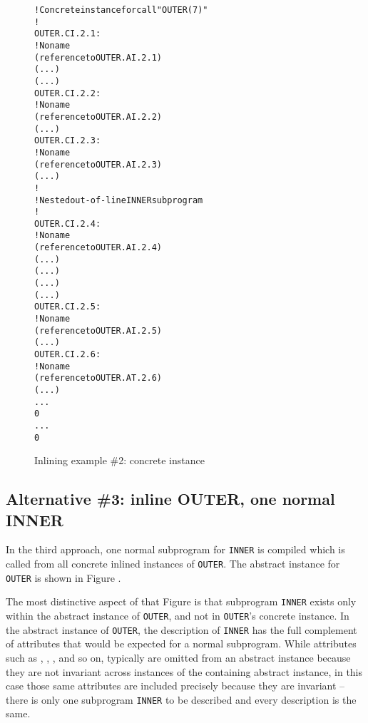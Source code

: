 \begin{figure}[t]
\begin{dwflisting}
\begin{alltt}

    ! Concrete instance for call "OUTER(7)"
    !
OUTER.CI.2.1:
    \DWTAGinlinedsubroutine
        ! No name
        \DWATabstractorigin(reference to OUTER.AI.2.1)
        \DWATlowpc(...)
        \DWAThighpc(...)
OUTER.CI.2.2:
        \DWTAGformalparameter
            ! No name
            \DWATabstractorigin(reference to OUTER.AI.2.2)
            \DWATlocation(...)
OUTER.CI.2.3:
        \DWTAGvariable
            ! No name
            \DWATabstractorigin(reference to OUTER.AI.2.3)
            \DWATlocation(...)
        !
        ! Nested out-of-line INNER subprogram
        !
OUTER.CI.2.4:
        \DWTAGsubprogram
            ! No name
            \DWATabstractorigin(reference to OUTER.AI.2.4)
            \DWATlowpc(...)
            \DWAThighpc(...)
            \DWATframebase(...)
            \DWATstaticlink(...)
OUTER.CI.2.5:
            \DWTAGformalparameter
                ! No name
                \DWATabstractorigin(reference to OUTER.AI.2.5)
                \DWATlocation(...)
OUTER.CI.2.6:
            \DWTAGvariable
                ! No name
                \DWATabstractorigin(reference to OUTER.AT.2.6)
                \DWATlocation(...)
            ...
            0
        ...
        0
\end{alltt}
\end{dwflisting}
\caption{Inlining example \#2: concrete instance}
\label{fig:inliningexample2concreteinstance}
\end{figure}

\subsection{Alternative \#3: inline OUTER, one normal INNER}
\label{app:inlineouteronenormalinner}

In the third approach, one normal subprogram for \texttt{INNER} is
compiled which is called from all concrete inlined instances of
\texttt{OUTER}. The abstract instance for \texttt{OUTER} is shown in 
Figure .

The most distinctive aspect of that Figure is that subprogram
\texttt{INNER} exists only within the abstract instance of \texttt{OUTER},
and not in \texttt{OUTER}\textquoteright s concrete instance. In the abstract
instance of \texttt{OUTER}, the description of \texttt{INNER} has the full
complement of attributes that would be expected for a
normal subprogram. 
While attributes such as 
\DWATlowpc,
\DWAThighpc, 
\DWATlocation,
and so on, typically are omitted
from 
an 
abstract instance because they are not invariant across
instances of the containing abstract instance, in this case
those same attributes are included precisely because they are
invariant -- there is only one subprogram \texttt{INNER} to be described
and every description is the same.

